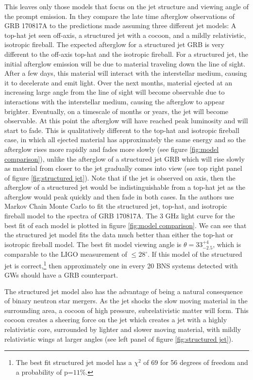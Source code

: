 \documentclass[11pt]{cuthesis}
\begin{document}
This leaves only those models that focus on the jet structure and viewing angle of the prompt emission. In \cite{Lazzati_afterglow} they compare the late time afterglow observations of GRB 170817A to the predictions made assuming three different jet models: A top-hat jet seen off-axis, a structured jet with a cocoon, and a mildly relativistic, isotropic fireball. The expected afterglow for a structured jet GRB is very different to the off-axis top-hat and the isotropic fireball. For a structured jet, the initial afterglow emission will be due to material traveling down the line of sight. After a few days, this material will interact with the interstellar medium, causing it to decelerate and emit light. Over the next months, material ejected at an increasing large angle from the line of sight will become observable due to interactions with the interstellar medium, causing the afterglow to appear brighter. Eventually, on a timescale of months or years, the jet will become observable. At this point the afterglow will have reached peak luminosity and will start to fade. This is qualitatively different to the top-hat and isotropic fireball case, in which all ejected material has approximately the same energy and so the afterglow rises more rapidly and fades more slowly (see figure \ref{fig:model comparison}), unlike the afterglow of a structured jet GRB which will rise slowly as material from closer to the jet gradually comes into view (see top right panel of figure \ref{fig:structured jet}). Note that if the jet is observed on axis, then the afterglow of a structured jet would be indistinguishable from a top-hat jet as the afterglow would peak quickly and then fade in both cases. In \cite{Lazzati_afterglow} the authors use Markov Chain Monte Carlo to fit the structured jet, top-hat, and isotropic fireball model to the spectra of GRB 170817A. The 3 GHz light curve for the best fit of each model is plotted in figure \ref{fig:model comparison}. We can see that the structured jet model fits the data much better than either the top-hat or isotropic fireball model. The best fit model viewing angle is $\theta = 33^{+4}_{-2.5}$, which is comparable to the LIGO measurement of $\leq 28^\circ$. If this model of the structured jet is correct,\footnote{The best fit structured jet model has a $\chi^2$ of 69 for 56 degrees of freedom and a probability of p=$11\%$.} then approximately one in every 20 BNS systems detected with GWs should have a GRB counterpart. \cite{Lazzati_afterglow} 

The structured jet model also has the advantage of being a natural consequence of binary neutron star mergers. As the jet shocks the slow moving material in the surrounding area, a cocoon of high pressure, subrelativistic matter will form. This cocoon creates a sheering force on the jet which creates a jet with a highly relativistic core, surrounded by lighter and slower moving material, with mildly relativistic wings at larger angles (see left panel of figure \ref{fig:structured jet}). 
\end{document}
